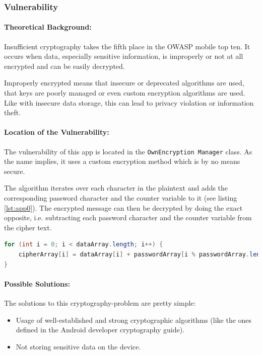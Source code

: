 \subsubsection{Vulnerability}
\paragraph{Theoretical Background:}
Insufficient cryptography takes the fifth place in the OWASP mobile top ten. It occurs when data, especially sensitive information, is improperly or not at all encrypted and can be easily decrypted. 

Improperly encrypted means that insecure or deprecated algorithms are used, that keys are poorly managed or even custom encryption algorithms are used. Like with insecure data storage, this can lead to privacy violation or information theft.

\paragraph{Location of the Vulnerability:} \label{sec:app1-vulnerability}
The vulnerability of this app is located in the \texttt{OwnEncryption Manager} class. As the name implies, it uses a custom encryption method which is by no means secure. 

The algorithm iterates over each character in the plaintext and adds the corresponding password character and the counter variable to it (see listing \ref{lst:app0}). The encrypted message can then be decrypted by doing the exact opposite, i.e. subtracting each password character and the counter variable from the cipher text.

\begin{lstlisting}[language=Java, label={lst:app0}]
for (int i = 0; i < dataArray.length; i++) {
    cipherArray[i] = dataArray[i] + passwordArray[i % passwordArray.length] + i;
}
\end{lstlisting}


\paragraph{Possible Solutions:}
The solutions to this cryptography-problem are pretty simple:
\begin{itemize}
	\item Usage of well-established and strong cryptographic algorithms (like the ones defined in the Android developer cryptography guide).
	\item Not storing sensitive data on the device.
\end{itemize}


